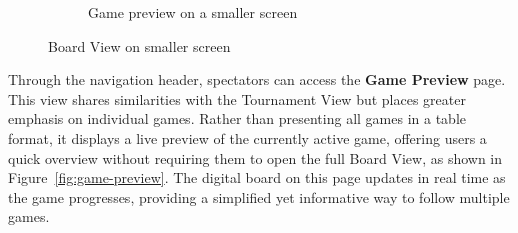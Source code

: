 \begin{figure}[h!]
\begin{subfigure}[h!]{0.4\linewidth}
        \caption{Game preview on a smaller screen}
        \label{fig:small-game-preview}
    \end{subfigure}
    \caption{Board View on smaller screen}
    \label{fig:small-view-game-preview-group}
\end{figure}

Through the navigation header, spectators can access the \textbf{Game Preview} page. This view shares similarities with the Tournament View but places greater emphasis on individual games. Rather than presenting all games in a table format, it displays a live preview of the currently active game, offering users a quick overview without requiring them to open the full Board View, as shown in Figure~\ref{fig:game-preview}. The digital board on this page updates in real time as the game progresses, providing a simplified yet informative way to follow multiple games. \\

